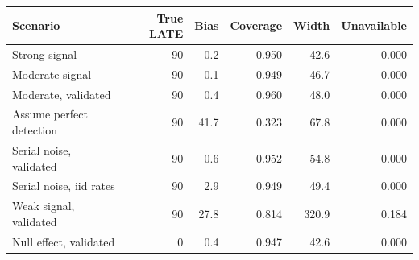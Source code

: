 \begin{tabular}{@{}lrrrrr@{}}
\toprule
Scenario & True LATE & Bias & Coverage & Width & Unavailable\\
\midrule
Strong signal & 90 & -0.2 & 0.950 & 42.6 & 0.000 \\
Moderate signal & 90 & 0.1 & 0.949 & 46.7 & 0.000 \\
Moderate, validated & 90 & 0.4 & 0.960 & 48.0 & 0.000 \\
Assume perfect detection & 90 & 41.7 & 0.323 & 67.8 & 0.000 \\
Serial noise, validated & 90 & 0.6 & 0.952 & 54.8 & 0.000 \\
Serial noise, iid rates & 90 & 2.9 & 0.949 & 49.4 & 0.000 \\
Weak signal, validated & 90 & 27.8 & 0.814 & 320.9 & 0.184 \\
Null effect, validated & 0 & 0.4 & 0.947 & 42.6 & 0.000 \\
\bottomrule
\end{tabular}

